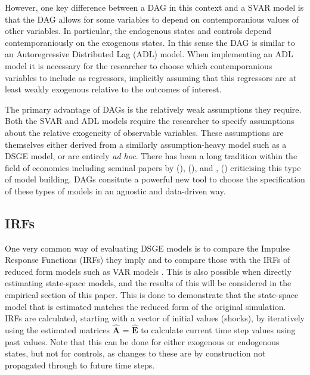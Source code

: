 \documentclass{article}
\begin{document}
However, one key difference between a DAG in this context and a SVAR model is that the DAG allows for some variables to depend on contemporanious values of other variables. In particular, the endogenous states and controls depend contemporaniously on the exogenous states. In this sense the DAG is similar to an Autoregressive Distributed Lag (ADL) model. When implementing an ADL model it is necessary for the researcher to choose which contemporanious variables to include as regressors, implicitly assuming that this regressors are at least weakly exogenous relative to the outcomes of interest. 

The primary advantage of DAGs is the relatively weak assumptions they require. Both the SVAR and ADL models require the researcher to specify assumptions about the relative exogeneity of observable variables. These assumptions are themselves either derived from a similarly assumption-heavy model such as a DSGE model, or are entirely \textit{ad hoc}. There has been a long tradition within the field of economics including seminal papers by \citeauthor{lucas1976econometric} (\citeyear{lucas1976econometric}), \citeauthor{sims1980macroeconomics} (\citeyear{sims1980macroeconomics}), and \citeauthor{jorda2005estimation}, (\citeyear{jorda2005estimation}) criticising this type of model building. DAGs consitute a powerful new tool to choose the specification of these types of models in an agnostic and data-driven way.

\subsection{IRFs}

One very common way of evaluating DSGE models is to compare the Impulse Response Functions (IRFs) they imply and to compare those with the IRFs of reduced form models such as VAR models \parencite[p.83]{ramey2016handbook}. This is also possible when directly estimating state-space models, and the results of this will be considered in the empirical section of this paper. This is done to demonstrate that the state-space model that is estimated matches the reduced form of the original simulation. IRFs are calculated, starting with a vector of initial values (shocks), by iteratively using the estimated matrices $\hat{\mathbf{A}}$ = $\hat{\mathbf{E}}$ to calculate current time step values using past values. Note that this can be done for either exogenous or endogenous states, but not for controls, as changes to these are by construction not propagated through to future time steps.
\end{document}
